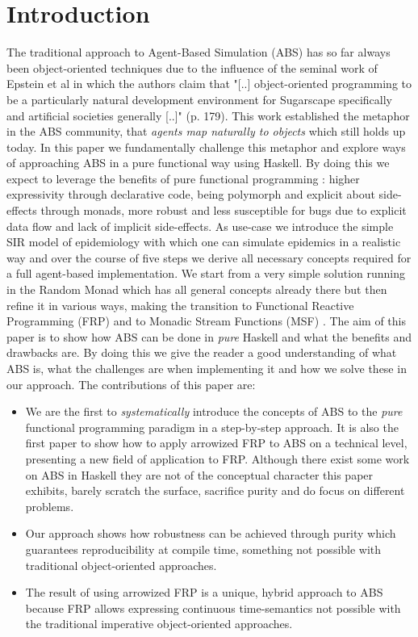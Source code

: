 \section{Introduction}
The traditional approach to Agent-Based Simulation (ABS) has so far always been object-oriented techniques due to the influence of the seminal work of Epstein et al \cite{epstein_growing_1996} in which the authors claim that "[..] object-oriented programming to be a particularly natural development environment for Sugarscape specifically and artificial societies generally [..]" (p. 179). This work established the metaphor in the ABS community, that \textit{agents map naturally to objects} \cite{north_managing_2007} which still holds up today.
In this paper we fundamentally challenge this metaphor and explore ways of approaching ABS in a pure functional way using Haskell. By doing this we expect to leverage the benefits of pure functional programming \cite{hudak_history_2007}: higher expressivity through declarative code, being polymorph and explicit about side-effects through monads, more robust and less susceptible for bugs due to explicit data flow and lack of implicit side-effects.
As use-case we introduce the simple SIR model of epidemiology with which one can simulate epidemics in a realistic way and over the course of five steps we derive all necessary concepts required for a full agent-based implementation. We start from a very simple solution running in the Random Monad which has all general concepts already there but then refine it in various ways, making the transition to Functional Reactive Programming (FRP) \cite{wan_functional_2000} and to Monadic Stream Functions (MSF) \cite{perez_functional_2016}.
The aim of this paper is to show how ABS can be done in \textit{pure} Haskell and what the benefits and drawbacks are. By doing this we give the reader a good understanding of what ABS is, what the challenges are when implementing it and how we solve these in our approach.
The contributions of this paper are:

\begin{itemize}
	\item We are the first to \textit{systematically} introduce the concepts of ABS to the \textit{pure} functional programming paradigm in a step-by-step approach. It is also the first paper to show how to apply arrowized FRP to ABS on a technical level, presenting a new field of application to FRP. Although there exist some work on ABS in Haskell they are not of the conceptual character this paper exhibits, barely scratch the surface, sacrifice purity and do focus on different problems.
	\item Our approach shows how robustness can be achieved through purity which guarantees reproducibility at compile time, something not possible with traditional object-oriented approaches.
	\item The result of using arrowized FRP is a unique, hybrid approach to ABS because FRP allows expressing continuous time-semantics not possible with the traditional imperative object-oriented approaches.
\end{itemize}

